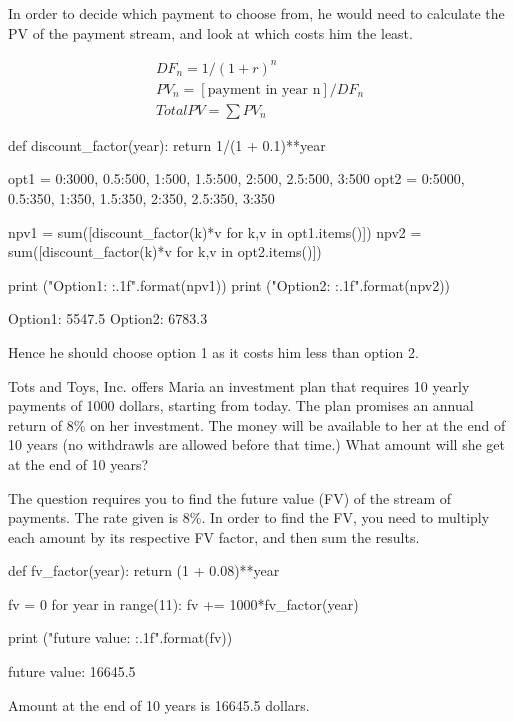 \cprotEnv\begin{solution}
In order to decide which payment to choose from, he would need to calculate the PV of the payment stream, and look at which costs him the least. 

\begin{gather*}
DF_n = 1/(1 + r)^n \\
PV_n = [\textrm{payment in year n}] / DF_n \\
Total PV = \sum PV_n
\end{gather*}

\begin{ipython}
def discount_factor(year):
    return 1/(1 + 0.1)**year

opt1 = {0:3000, 0.5:500, 1:500, 1.5:500, 2:500, 2.5:500, 3:500}
opt2 = {0:5000, 0.5:350, 1:350, 1.5:350, 2:350, 2.5:350, 3:350}

npv1 = sum([discount_factor(k)*v for k,v in opt1.items()])
npv2 = sum([discount_factor(k)*v for k,v in opt2.items()])

print ("Option1: {:.1f}".format(npv1))
print ("Option2: {:.1f}".format(npv2))
\end{ipython}
\begin{ioutput}
Option1: 5547.5
Option2: 6783.3
\end{ioutput}
Hence he should choose option 1 as it costs him less than option 2.
\end{solution}

\begin{question}
Tots and Toys, Inc. offers Maria an investment plan that requires 10 yearly payments of 1000 dollars, starting from today. The plan promises an annual return of 8\% on her investment. The money will be available to her at the end of 10 years (no withdrawls are allowed before that time.) 
What amount will she get at the end of 10 years?
\end{question}

\cprotEnv\begin{solution}
The question requires you to find the future value (FV) of the stream of payments. The rate given is 8\%.
In order to find the FV, you need to multiply each amount by its respective FV factor, and then sum the results.

\begin{ipython}
def fv_factor(year):
    return (1 + 0.08)**year

fv = 0
for year in range(11):
    fv += 1000*fv_factor(year)

print ("future value: {:.1f}".format(fv))
\end{ipython}
\begin{ioutput}
future value: 16645.5
\end{ioutput}
Amount at the end of 10 years is 16645.5 dollars.
\end{solution}


